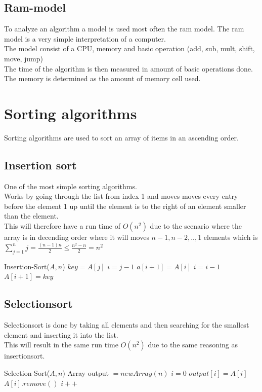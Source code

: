\documentclass[12pt, a4paper]{article}
\begin{document}
			\subsection{Ram-model}
				To analyze an algorithm a model is used most often the ram model.
				The ram model is a very simple interpretation of a computer.\\
				The model consist of a CPU, memory and basic operation (add, sub, mult, shift, move, jump)\\
				The time of the algorithm is then measured in amount of basic operations done.\\
				The memory is determined as the amount of memory cell used.
		\section{Sorting algorithms}
			Sorting algorithms are used to sort an array of items in an ascending order.\\
			\subsection{Insertion sort}
				One of the most simple sorting algorithms.\\
				Works by going through the list from index 1 and moves moves every entry before the element 1 up until the element is to the right of an element smaller than the element.\\
				This will therefore have a run time of $O(n^2)$ due to the scenario where the array is in decending order where it will moves $n-1,n-2,..,1$ elements which is $\sum\limits_{j=1}^nj=\frac{(n-1)n}{2}\leq\frac{n^2-n}{2}=n^2$
				\begin{algorithmic}[1]
					\State Insertion-Sort($A,n$)
						\State $key = A[j]$
						\State $i=j-1$
							\State $a[i+1]=A[i]$
							\State $i = i-1$
						\EndWhile
						\State $A[i+1]=key$
					\EndFor
				\end{algorithmic}
			\subsection{Selectionsort}
				Selectionsort is done by taking all elements and then searching for the smallest element and inserting it into the list.\\
				This will result in the same run time $O(n^2)$ due to the same reasoning as insertionsort.\\
				\begin{algorithmic}[1]
					\State Selection-Sort($A,n$)
					\State Array output $= new Array(n)$
					\State $i = 0$
						\State $output[i] = A[i]$
						\State $A[i].remove()$
						\State $i++$
					\EndWhile
				\end{algorithmic}
\end{document}
